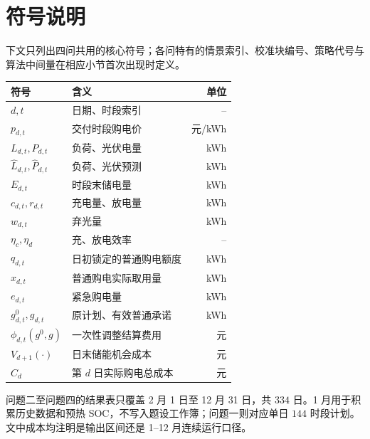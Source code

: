 \section{符号说明}\label{sec:notation}

下文只列出四问共用的核心符号；各问特有的情景索引、校准块编号、策略代号与算法中间量在相应小节首次出现时定义。

\begin{center}
\begin{tabularx}{0.96\linewidth}{@{}lYr@{}}
\toprule
符号 & 含义 & 单位 \\
\midrule
$d,t$ & 日期、时段索引 & -- \\
$p_{d,t}$ & 交付时段购电价 & 元/kWh \\
$L_{d,t},P_{d,t}$ & 负荷、光伏电量 & kWh \\
$\widehat L_{d,t},\widehat P_{d,t}$ & 负荷、光伏预测 & kWh \\
$E_{d,t}$ & 时段末储电量 & kWh \\
$c_{d,t},r_{d,t}$ & 充电量、放电量 & kWh \\
$w_{d,t}$ & 弃光量 & kWh \\
$\eta_c,\eta_d$ & 充、放电效率 & -- \\
\midrule
$q_{d,t}$ & 日初锁定的普通购电额度 & kWh \\
$x_{d,t}$ & 普通购电实际取用量 & kWh \\
$e_{d,t}$ & 紧急购电量 & kWh \\
$g^0_{d,t},g_{d,t}$ & 原计划、有效普通承诺 & kWh \\
$\phi_{d,t}(g^0,g)$ & 一次性调整结算费用 & 元 \\
$V_{d+1}(\cdot)$ & 日末储能机会成本 & 元 \\
\midrule
$C_d$ & 第 $d$ 日实际购电总成本 & 元 \\
\bottomrule
\end{tabularx}
\end{center}

\noindent 问题二至问题四的结果表只覆盖 2 月 1 日至 12 月 31 日，共 $334$ 日。1 月用于积累历史数据和预热 SOC，不写入题设工作簿；问题一则对应单日 $144$ 时段计划。文中成本均注明是输出区间还是 1--12 月连续运行口径。
